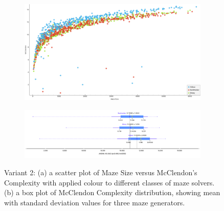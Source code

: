         \begin{figure}[!h]
            \centering
            \begin{subfigure}[!h]{0.4\textwidth}
               \includegraphics[scale =0.15]{McClendonvsSize_variant2.png}
               \caption{}
            \end{subfigure}
            \begin{subfigure}[!h]{0.5\textwidth}
               \includegraphics[width=1\linewidth]{McClendon_variant2.png}
               \caption{}
            \end{subfigure}
            \caption{Variant 2: (a) a scatter plot of Maze Size versus McClendon's Complexity with applied colour to different classes of maze solvers.
             (b) a box plot of McClendon Complexity distribution, showing mean with standard deviation values for three maze generators.}
            \end{figure}%
\newpage
